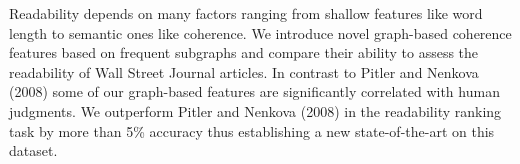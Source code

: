 Readability depends on many factors ranging from shallow features like word length to semantic ones like coherence. We introduce novel graph-based coherence features based on frequent subgraphs and compare their ability to assess the readability of Wall Street Journal articles. In contrast to Pitler and Nenkova (2008) some of our graph-based features are significantly correlated with human judgments. We outperform Pitler and Nenkova (2008) in the readability ranking task by more than 5\% accuracy thus establishing a new state-of-the-art on this dataset.
